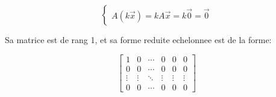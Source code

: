 \documentclass{config/homework}
\begin{document}
    \[
        \begin{cases}
            A(k\vec{x}) = kA\vec{x} = k\vec{0} = \vec{0}
        \end{cases}
    \]

    Sa matrice est de rang 1, et sa forme reduite echelonnee est de la forme:

    \[
        \left[
            \begin{array}{rrrrr|r}
                1 & 0 & \cdots & 0 & 0 & 0 \\
                0 & 0 & \cdots & 0 & 0 & 0 \\
                \vdots & \vdots & \ddots & \vdots & \vdots & \vdots \\
                0 & 0 & \cdots & 0 & 0 & 0
            \end{array}
        \right]
    \]

    \noindent{}
    \newpage
\end{document}

